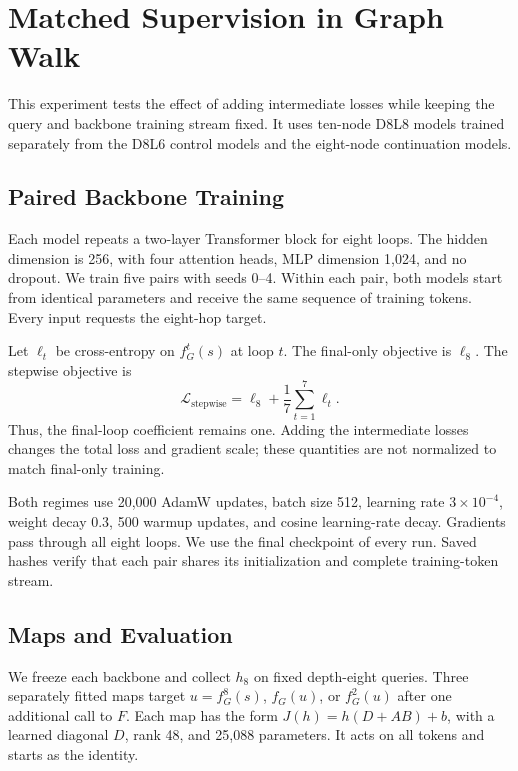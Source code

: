 \documentclass{article}
\begin{document}
\section{Matched Supervision in Graph Walk}
\label{app:matched-supervision}
This experiment tests the effect of adding intermediate losses while keeping the query and backbone training stream fixed. It uses ten-node D8L8 models trained separately from the D8L6 control models and the eight-node continuation models.

\subsection{Paired Backbone Training}

Each model repeats a two-layer Transformer block for eight loops. The hidden dimension is 256, with four attention heads, MLP dimension 1,024, and no dropout. We train five pairs with seeds 0--4. Within each pair, both models start from identical parameters and receive the same sequence of training tokens. Every input requests the eight-hop target.

Let $\ell_t$ be cross-entropy on $f_G^t(s)$ at loop $t$. The final-only objective is $\ell_8$. The stepwise objective is
\begin{equation}
\mathcal{L}_{\mathrm{stepwise}}=\ell_8+\frac{1}{7}\sum_{t=1}^{7}\ell_t.
\end{equation}
Thus, the final-loop coefficient remains one. Adding the intermediate losses changes the total loss and gradient scale; these quantities are not normalized to match final-only training.

Both regimes use 20,000 AdamW updates, batch size 512, learning rate $3\times10^{-4}$, weight decay 0.3, 500 warmup updates, and cosine learning-rate decay. Gradients pass through all eight loops. We use the final checkpoint of every run. Saved hashes verify that each pair shares its initialization and complete training-token stream.

\subsection{Maps and Evaluation}

We freeze each backbone and collect $h_8$ on fixed depth-eight queries. Three separately fitted maps target $u=f_G^8(s)$, $f_G(u)$, or $f_G^2(u)$ after one additional call to $F$. Each map has the form $J(h)=h(D+AB)+b$, with a learned diagonal $D$, rank 48, and 25,088 parameters. It acts on all tokens and starts as the identity.
\end{document}
